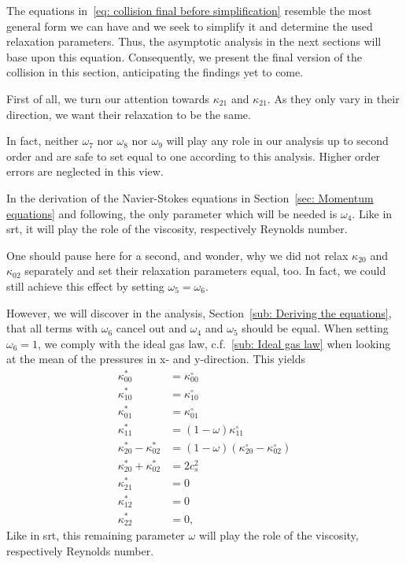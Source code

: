 The equations in~\eqref{eq: collision final before simplification} resemble the most general form we can have and we seek to simplify it and determine the used relaxation parameters.
Thus, the asymptotic analysis in the next sections will base upon this equation.
Consequently, we present the final version of the collision in this section, anticipating the findings yet to come.

First of all, we turn our attention towards $\kappa_{21}$ and $\kappa_{21}$.
As they only vary in their direction, we want their relaxation to be the same.

In fact, neither $\omega_7$ nor $\omega_8$ nor $\omega_9$ will play any role in our analysis up to second order and are safe to set equal to one according to this analysis.
Higher order errors are neglected in this view.

In the derivation of the Navier-Stokes equations in Section~\ref{sec: Momentum equations} and following, the only parameter which will be needed is $\omega_4$.
Like in \gls{srt}, it will play the role of the viscosity, respectively Reynolds number.

One should pause here for a second, and wonder, why we did not relax $\kappa_{20}$ and $\kappa_{02}$ separately and set their relaxation parameters equal, too.
In fact, we could still achieve this effect by setting $\omega_5=\omega_6$.

However, we will discover in the analysis, Section~\ref{sub: Deriving the equations}, that all terms with $\omega_6$ cancel out and $\omega_4$ and $\omega_5$ should be equal.
When setting $\omega_6=1$, we comply with the ideal gas law, c.f.~\ref{sub: Ideal gas law} when looking at the mean of the pressures in x- and y-direction.
This yields
\begin{equation}
  \label{eq: collision equation system full}
  \begin{aligned}
    \kappa_{00}^{*} & = \kappa_{00}^{\circ}\\
    \kappa_{10}^{*} & = \kappa_{10}^{\circ}\\
    \kappa_{01}^{*} & = \kappa_{01}^{\circ}\\
    \kappa_{11}^{*} & = (1-\omega)\kappa_{11}^{\circ}\\
    \kappa_{20}^{*} - \kappa_{02}^{*}
      & = (1-\omega) (\kappa_{20}^{\circ}- \kappa_{02}^{\circ}) \\
    \kappa_{20}^{*} + \kappa_{02}^{*}
      & = 2 c_s^2 \\
    \kappa_{21}^{*} & = 0 \\
    \kappa_{12}^{*} & = 0 \\
    \kappa_{22}^{*} & = 0,
  \end{aligned}
\end{equation}
Like in \gls{srt}, this remaining parameter $\omega$ will play the role of the viscosity, respectively Reynolds number.

